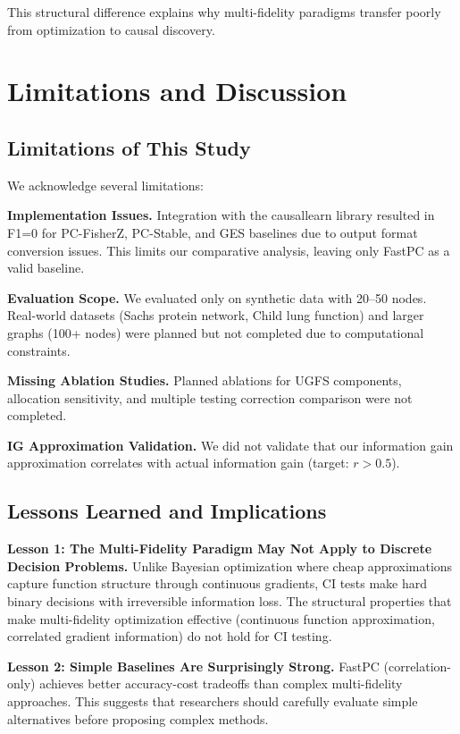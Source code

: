 \documentclass{article}
\begin{document}
This structural difference explains why multi-fidelity paradigms transfer poorly from optimization to causal discovery.

\section{Limitations and Discussion}

\subsection{Limitations of This Study}

We acknowledge several limitations:

\textbf{Implementation Issues.} Integration with the causallearn library resulted in F1=0 for PC-FisherZ, PC-Stable, and GES baselines due to output format conversion issues. This limits our comparative analysis, leaving only FastPC as a valid baseline.

\textbf{Evaluation Scope.} We evaluated only on synthetic data with 20--50 nodes. Real-world datasets (Sachs protein network, Child lung function) and larger graphs (100+ nodes) were planned but not completed due to computational constraints.

\textbf{Missing Ablation Studies.} Planned ablations for UGFS components, allocation sensitivity, and multiple testing correction comparison were not completed.

\textbf{IG Approximation Validation.} We did not validate that our information gain approximation correlates with actual information gain (target: $r > 0.5$).

\subsection{Lessons Learned and Implications}

\textbf{Lesson 1: The Multi-Fidelity Paradigm May Not Apply to Discrete Decision Problems.} Unlike Bayesian optimization where cheap approximations capture function structure through continuous gradients, CI tests make hard binary decisions with irreversible information loss. The structural properties that make multi-fidelity optimization effective (continuous function approximation, correlated gradient information) do not hold for CI testing.

\textbf{Lesson 2: Simple Baselines Are Surprisingly Strong.} FastPC (correlation-only) achieves better accuracy-cost tradeoffs than complex multi-fidelity approaches. This suggests that researchers should carefully evaluate simple alternatives before proposing complex methods.
\end{document}
